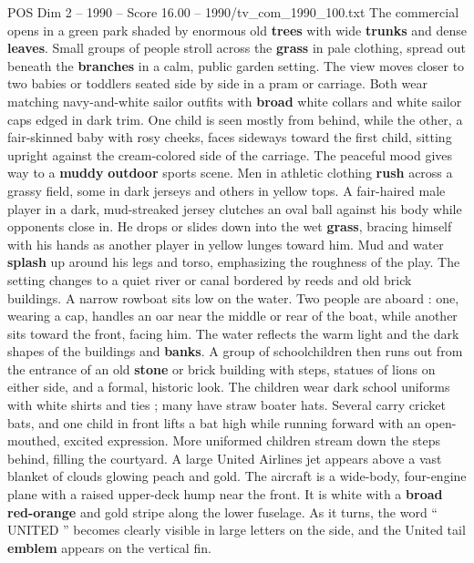 \begin{textsample}{POS Dim 2 – 1990 – Score 16.00 – 1990/tv\_com\_1990\_100.txt}  \label{ex:f2_pos_040}
The commercial opens in a green park shaded by enormous old \textbf{trees} with wide \textbf{trunks} and dense \textbf{leaves}.
Small groups of people stroll across the \textbf{grass} in pale clothing, spread out beneath the \textbf{branches} in a calm, public garden setting.
The view moves closer to two babies or toddlers seated side by side in a pram or carriage.
Both wear matching navy-and-white sailor outfits with \textbf{broad} white collars and white sailor caps edged in dark trim.
One child is seen mostly from behind, while the other, a fair-skinned baby with rosy cheeks, faces sideways toward the first child, sitting upright against the cream-colored side of the carriage.
The peaceful mood gives way to a \textbf{muddy} \textbf{outdoor} sports scene.
Men in athletic clothing \textbf{rush} across a grassy field, some in dark jerseys and others in yellow tops.
A fair-haired male player in a dark, mud-streaked jersey clutches an oval ball against his body while opponents close in.
He drops or slides down into the wet \textbf{grass}, bracing himself with his hands as another player in yellow lunges toward him.
Mud and water \textbf{splash} up around his legs and torso, emphasizing the roughness of the play.
The setting changes to a quiet river or canal bordered by reeds and old brick buildings.
A narrow rowboat sits low on the water.
Two people are aboard : one, wearing a cap, handles an oar near the middle or rear of the boat, while another sits toward the front, facing him.
The water reflects the warm light and the dark shapes of the buildings and \textbf{banks}.
A group of schoolchildren then runs out from the entrance of an old \textbf{stone} or brick building with steps, statues of lions on either side, and a formal, historic look.
The children wear dark school uniforms with white shirts and ties ; many have straw boater hats.
Several carry cricket bats, and one child in front lifts a bat high while running forward with an open-mouthed, excited expression.
More uniformed children stream down the steps behind, filling the courtyard.
A large United Airlines jet appears above a vast blanket of clouds glowing peach and gold.
The aircraft is a wide-body, four-engine plane with a raised upper-deck hump near the front.
It is white with a \textbf{broad} \textbf{red-orange} and gold stripe along the lower fuselage.
As it turns, the word “ UNITED ” becomes clearly visible in large letters on the side, and the United tail \textbf{emblem} appears on the vertical fin.

\end{textsample}
